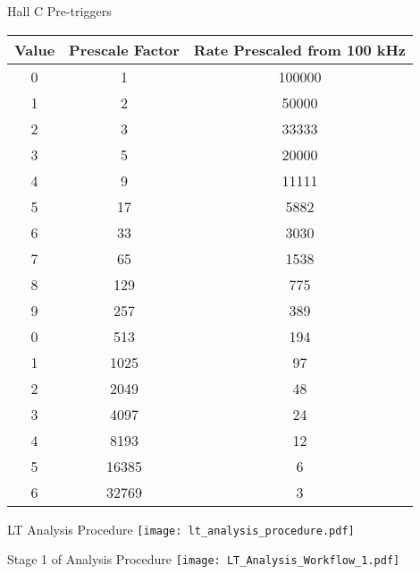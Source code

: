 \begin{Mtable}{Hall C Pre-triggers}
  \centering
  \begin{tabular}{|c|c|c|}
    \hline
    \textbf{Value} & \textbf{Prescale Factor} & \textbf{Rate Prescaled from 100 kHz} \\
    \hline    
    0   &        1 & 100000 \\
    1   &        2 & 50000 \\
    2   &        3 & 33333 \\
    3   &        5 & 20000 \\
    4   &        9 & 11111 \\
    5   &       17 & 5882 \\
    6   &       33 & 3030 \\
    7   &       65 & 1538 \\
    8   &      129 & 775 \\
    9   &      257 & 389 \\
    0   &      513 & 194 \\
    1   &     1025 & 97 \\
    2   &     2049 & 48 \\
    3   &     4097 & 24 \\
    4   &     8193 & 12 \\
    5   &    16385 & 6 \\
    6   &    32769 & 3 \\
    \hline
  \end{tabular}
  \caption{List of prescale values to their corresponding factor. The third column shows an example of a prescaled rate from 100 kHz.}
  \label{tab:2-5_prescale}
\end{Mtable}


%
%

\begin{Mfigure}{LT Analysis Procedure}
  \centering
  \texttt{[image: lt\_analysis\_procedure.pdf]}
  \caption{LT analysis procedure.}
  \label{fig:3-1_lt_analysis_procedure}
\end{Mfigure}

\begin{landscape}
\begin{Mfigure}{Stage 1 of Analysis Procedure}
  \centering
  \texttt{[image: LT\_Analysis\_Workflow\_1.pdf]}
  \caption{Preprocess the data by applying offsets and defining PID and CT cuts.}
  \label{fig:3-1_LT_Analysis_Workflow_1}
\end{Mfigure}
\end{landscape}


